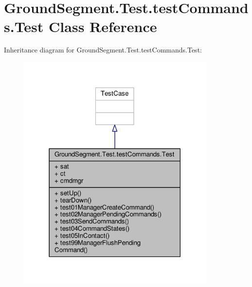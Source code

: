 \hypertarget{class_ground_segment_1_1_test_1_1test_commands_1_1_test}{}\section{Ground\+Segment.\+Test.\+test\+Commands.\+Test Class Reference}
\label{class_ground_segment_1_1_test_1_1test_commands_1_1_test}


Inheritance diagram for Ground\+Segment.\+Test.\+test\+Commands.\+Test\+:\nopagebreak
\begin{figure}[H]
\begin{center}
\leavevmode
\includegraphics[width=282pt]{class_ground_segment_1_1_test_1_1test_commands_1_1_test__inherit__graph}
\end{center}
\end{figure}


